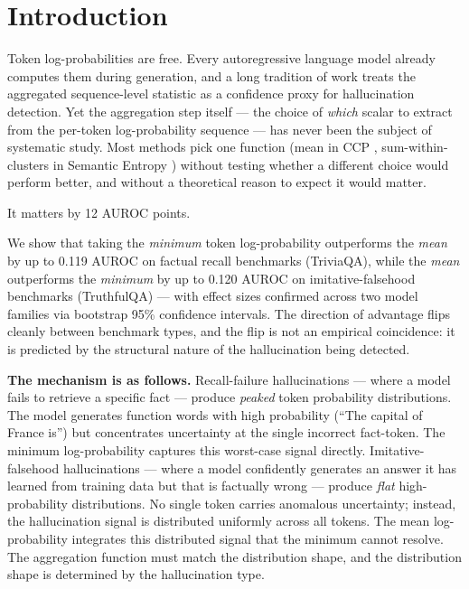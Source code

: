 \section{Introduction}

Token log-probabilities are free. Every autoregressive language model already computes them during generation, and a long tradition of work \citep{kadavath2022,fadeeva2024,farquhar2024} treats the aggregated sequence-level statistic as a confidence proxy for hallucination detection. Yet the aggregation step itself --- the choice of \emph{which} scalar to extract from the per-token log-probability sequence --- has never been the subject of systematic study. Most methods pick one function (mean in CCP \citep{fadeeva2024}, sum-within-clusters in Semantic Entropy \citep{farquhar2024}) without testing whether a different choice would perform better, and without a theoretical reason to expect it would matter.

It matters by 12 AUROC points.

We show that taking the \emph{minimum} token log-probability outperforms the \emph{mean} by up to 0.119 AUROC on factual recall benchmarks (TriviaQA), while the \emph{mean} outperforms the \emph{minimum} by up to 0.120 AUROC on imitative-falsehood benchmarks (TruthfulQA) --- with effect sizes confirmed across two model families via bootstrap 95\% confidence intervals. The direction of advantage flips cleanly between benchmark types, and the flip is not an empirical coincidence: it is predicted by the structural nature of the hallucination being detected.

\textbf{The mechanism is as follows.} Recall-failure hallucinations --- where a model fails to retrieve a specific fact --- produce \emph{peaked} token probability distributions. The model generates function words with high probability (``The capital of France is'') but concentrates uncertainty at the single incorrect fact-token. The minimum log-probability captures this worst-case signal directly. Imitative-falsehood hallucinations --- where a model confidently generates an answer it has learned from training data but that is factually wrong --- produce \emph{flat} high-probability distributions. No single token carries anomalous uncertainty; instead, the hallucination signal is distributed uniformly across all tokens. The mean log-probability integrates this distributed signal that the minimum cannot resolve. The aggregation function must match the distribution shape, and the distribution shape is determined by the hallucination type.

